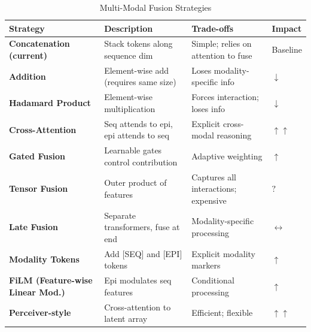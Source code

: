 \documentclass[11pt,a4paper]{article}
\begin{document}
\begin{longtable}{L{3cm}L{4.5cm}L{3.5cm}C{1.5cm}}
\caption{Multi-Modal Fusion Strategies} \\
\toprule
\textbf{Strategy} & \textbf{Description} & \textbf{Trade-offs} & \textbf{Impact} \\
\midrule
\endfirsthead
\bottomrule
\endlastfoot

\textbf{Concatenation (current)} & Stack tokens along sequence dim & Simple; relies on attention to fuse & Baseline \\

\textbf{Addition} & Element-wise add (requires same size) & Loses modality-specific info & \textcolor{negative}{$\downarrow$} \\

\textbf{Hadamard Product} & Element-wise multiplication & Forces interaction; loses info & \textcolor{negative}{$\downarrow$} \\

\textbf{Cross-Attention} & Seq attends to epi, epi attends to seq & Explicit cross-modal reasoning & \textcolor{positive}{$\uparrow\uparrow$} \\

\textbf{Gated Fusion} & Learnable gates control contribution & Adaptive weighting & \textcolor{positive}{$\uparrow$} \\

\textbf{Tensor Fusion} & Outer product of features & Captures all interactions; expensive & \textcolor{uncertain}{$?$} \\

\textbf{Late Fusion} & Separate transformers, fuse at end & Modality-specific processing & \textcolor{neutral}{$\leftrightarrow$} \\

\textbf{Modality Tokens} & Add [SEQ] and [EPI] tokens & Explicit modality markers & \textcolor{positive}{$\uparrow$} \\

\textbf{FiLM (Feature-wise Linear Mod.)} & Epi modulates seq features & Conditional processing & \textcolor{positive}{$\uparrow$} \\

\textbf{Perceiver-style} & Cross-attention to latent array & Efficient; flexible & \textcolor{positive}{$\uparrow\uparrow$} \\

\end{longtable}
\end{document}
